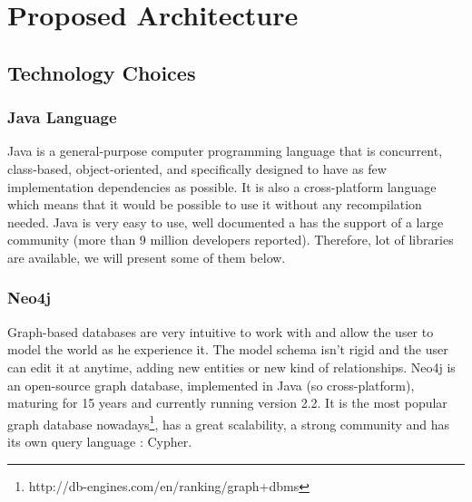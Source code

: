 
\chapter{Proposed Architecture} %

\label{chapter:Architecture} %



\section{Technology Choices}

\subsection{Java Language}
Java is a general-purpose computer programming language that is concurrent, class-based, object-oriented, and specifically designed to have as few implementation dependencies as possible. It is also a cross-platform language which means that it would be possible to use it without any recompilation needed. Java is very easy to use, well documented a has the support of a large community (more than 9 million developers reported). Therefore, lot of libraries are available, we will present some of them below. 

\subsection{Neo4j}
Graph-based databases are very intuitive to work with and allow the user to model the world as he experience it. The model schema isn't rigid and the user can edit it at anytime, adding new entities or new kind of relationships. Neo4j is an open-source graph database, implemented in Java (so cross-platform), maturing for 15 years and currently running version 2.2. It is the most popular graph database nowadays\footnote{http://db-engines.com/en/ranking/graph+dbms}, has a great scalability, a strong community and has its own query language : Cypher. 

